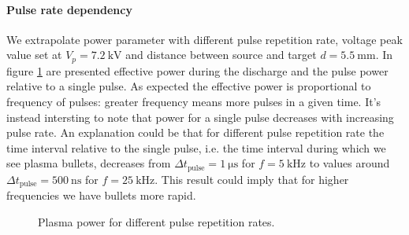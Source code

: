 \paragraph{Pulse rate dependency}
We extrapolate power parameter with different pulse repetition rate, voltage peak value set at $V_{p} = \SI{7.2}{\kilo\volt}$ and distance between source and target $d = \SI{5.5}{\milli\meter}$. In figure \ref{fig:Pfr} are presented effective power during the discharge and the pulse power relative to a single pulse. As expected the effective power is proportional to frequency of pulses: greater frequency means more pulses in a given time. It's instead intersting to note that power for a single pulse decreases with increasing pulse rate. 
An explanation could be that for different pulse repetition rate the time interval relative to the single pulse, i.e. the time interval during which we see plasma bullets, decreases from $\Delta t_{\text{pulse}} = \SI{1}{\micro\second}$ for $f = \SI{5}{\kilo\hertz}$ to values around $\Delta t_{\text{pulse}} = \SI{500}{\nano\second}$ for $f = \SI{25}{\kilo\hertz}$. This result could imply that for higher frequencies we have bullets more rapid.
\begin{figure}
 \centering
 \caption{Plasma power for different pulse repetition rates.}
 \label{fig:Pfr}
\end{figure}


